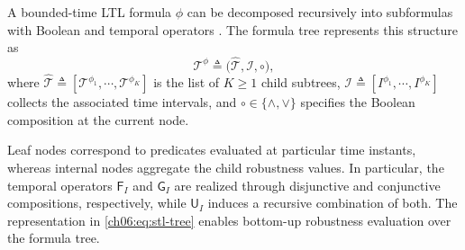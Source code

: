 \subsubsection{}
\label{ch06:subsec:stl-tree}

\begin{revision}
A bounded-time LTL formula $\phi$ can be decomposed recursively into
subformulas with Boolean and temporal operators
\citep{fainekos2009robustness,kurtz2022mixed,leung2023backpropagation}.
The formula tree represents this structure as
\begin{equation}
\label{ch06:eq:stl-tree}
\mathcal{T}^{\phi}\triangleq
\big(\widehat{\mathcal{T}},\mathcal{I},\circ\big),
\end{equation}
where
$\widehat{\mathcal{T}}\triangleq
[\mathcal{T}^{\phi_1},\cdots,\mathcal{T}^{\phi_K}]$
is the list of $K\geq 1$ child subtrees,
$\mathcal{I}\triangleq [I^{\phi_1},\cdots,I^{\phi_K}]$
collects the associated time intervals, and
$\circ\in\{\wedge,\vee\}$ specifies the Boolean composition at the
current node.
\end{revision}
Leaf nodes correspond to predicates evaluated at particular time
instants, whereas internal nodes aggregate the child robustness values.
In particular, the temporal operators $\mathsf{F}_I$ and
$\mathsf{G}_I$ are realized through disjunctive and conjunctive
compositions, respectively, while $\mathsf{U}_I$ induces a recursive
combination of both.
The representation in \eqref{ch06:eq:stl-tree} enables bottom-up
robustness evaluation over the formula tree.

